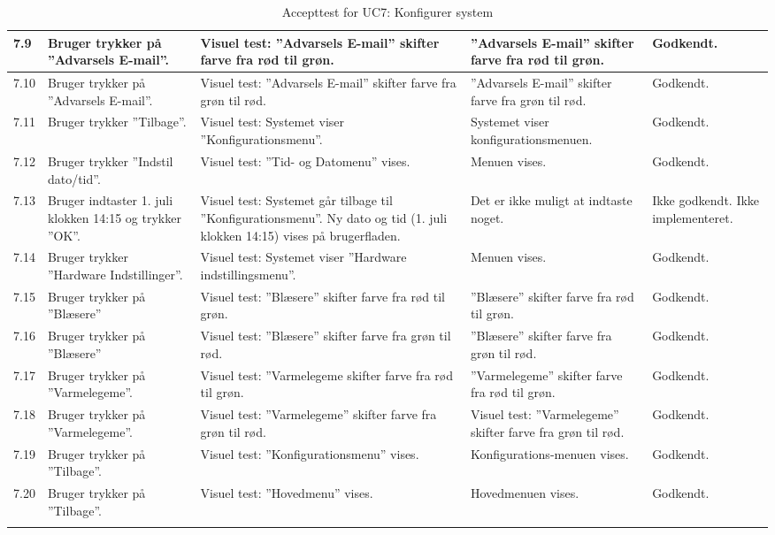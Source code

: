 \begin{longtable}{| l | >{\raggedright}X | >{\raggedright}X | >{\raggedright}X | >{\raggedright\arraybackslash}p{2.3cm} |}
    7.9 & Bruger trykker på ''Advarsels E-mail''. & Visuel test: ''Advarsels E-mail'' skifter farve fra rød til grøn. & ''Advarsels E-mail'' skifter farve fra rød til grøn. & Godkendt. \\ \hline
    7.10 & Bruger trykker på ''Advarsels E-mail''. & Visuel test: ''Advarsels E-mail'' skifter farve fra grøn til rød. & ''Advarsels E-mail'' skifter farve fra grøn til rød. & Godkendt. \\ \hline
    7.11 & Bruger trykker ''Tilbage''. & Visuel test: Systemet viser ''Konfigurationsmenu''. & Systemet viser konfigurationsmenuen. & Godkendt. \\ \hline
    7.12 & Bruger trykker ''Indstil dato/tid''. & Visuel test: ''Tid- og Datomenu'' vises. & Menuen vises. & Godkendt. \\ \hline
    7.13 & Bruger indtaster 1. juli klokken 14:15 og trykker ''OK''. & Visuel test: Systemet går tilbage til ''Konfigurationsmenu''. Ny dato og tid (1. juli klokken 14:15) vises på brugerfladen. & Det er ikke muligt at indtaste noget. & Ikke godkendt. Ikke implementeret. \\ \hline
    7.14 & Bruger trykker ''Hardware Indstillinger''. & Visuel test: Systemet viser ''Hardware indstillingsmenu''. & Menuen vises. & Godkendt. \\ \hline
    7.15 & Bruger trykker på ''Blæsere'' & Visuel test: ''Blæsere'' skifter farve fra rød til grøn. & ''Blæsere'' skifter farve fra rød til grøn. & Godkendt. \\ \hline
    7.16 & Bruger trykker på ''Blæsere'' & Visuel test: ''Blæsere'' skifter farve fra grøn til rød. & ''Blæsere'' skifter farve fra grøn til rød. & Godkendt. \\ \hline
    7.17 & Bruger trykker på ''Varmelegeme''. & Visuel test: ''Varmelegeme
 skifter farve fra rød til grøn. & ''Varmelegeme''  skifter farve fra rød til grøn. & Godkendt. \\ \hline
    7.18 & Bruger trykker på ''Varmelegeme''. & Visuel test: ''Varmelegeme'' skifter farve fra grøn til rød. & Visuel test: ''Varmelegeme'' skifter farve fra grøn til rød. & Godkendt. \\ \hline
    7.19 & Bruger trykker på ''Tilbage''. & Visuel test: ''Konfigurationsmenu'' vises. & Konfigurations-menuen vises. & Godkendt. \\ \hline
    7.20 & Bruger trykker på ''Tilbage''. & Visuel test: ''Hovedmenu'' vises. & Hovedmenuen vises. & Godkendt. \\ \hline
	\caption{Accepttest for UC7: Konfigurer system}\label{tbl:acceptUC7}
\end{longtable}
